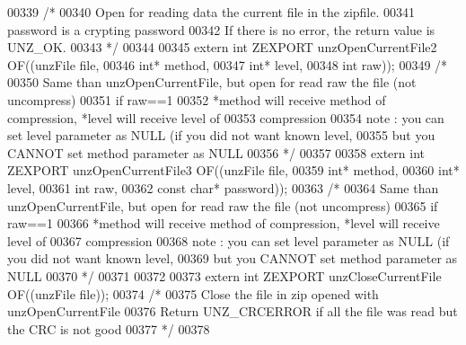 \begin{DoxyCode}
00339 \textcolor{comment}{/*}
00340 \textcolor{comment}{  Open for reading data the current file in the zipfile.}
00341 \textcolor{comment}{  password is a crypting password}
00342 \textcolor{comment}{  If there is no error, the return value is UNZ\_OK.}
00343 \textcolor{comment}{*/}
00344 
00345 \textcolor{keyword}{extern} \textcolor{keywordtype}{int} ZEXPORT unzOpenCurrentFile2 OF((unzFile file,
00346                                            \textcolor{keywordtype}{int}* method,
00347                                            \textcolor{keywordtype}{int}* level,
00348                                            \textcolor{keywordtype}{int} raw));
00349 \textcolor{comment}{/*}
00350 \textcolor{comment}{  Same than unzOpenCurrentFile, but open for read raw the file (not uncompress)}
00351 \textcolor{comment}{    if raw==1}
00352 \textcolor{comment}{  *method will receive method of compression, *level will receive level of}
00353 \textcolor{comment}{     compression}
00354 \textcolor{comment}{  note : you can set level parameter as NULL (if you did not want known level,}
00355 \textcolor{comment}{         but you CANNOT set method parameter as NULL}
00356 \textcolor{comment}{*/}
00357 
00358 \textcolor{keyword}{extern} \textcolor{keywordtype}{int} ZEXPORT unzOpenCurrentFile3 OF((unzFile file,
00359                                            \textcolor{keywordtype}{int}* method,
00360                                            \textcolor{keywordtype}{int}* level,
00361                                            \textcolor{keywordtype}{int} raw,
00362                                            \textcolor{keyword}{const} \textcolor{keywordtype}{char}* password));
00363 \textcolor{comment}{/*}
00364 \textcolor{comment}{  Same than unzOpenCurrentFile, but open for read raw the file (not uncompress)}
00365 \textcolor{comment}{    if raw==1}
00366 \textcolor{comment}{  *method will receive method of compression, *level will receive level of}
00367 \textcolor{comment}{     compression}
00368 \textcolor{comment}{  note : you can set level parameter as NULL (if you did not want known level,}
00369 \textcolor{comment}{         but you CANNOT set method parameter as NULL}
00370 \textcolor{comment}{*/}
00371 
00372 
00373 \textcolor{keyword}{extern} \textcolor{keywordtype}{int} ZEXPORT unzCloseCurrentFile OF((unzFile file));
00374 \textcolor{comment}{/*}
00375 \textcolor{comment}{  Close the file in zip opened with unzOpenCurrentFile}
00376 \textcolor{comment}{  Return UNZ\_CRCERROR if all the file was read but the CRC is not good}
00377 \textcolor{comment}{*/}
00378 

\end{DoxyCode}
